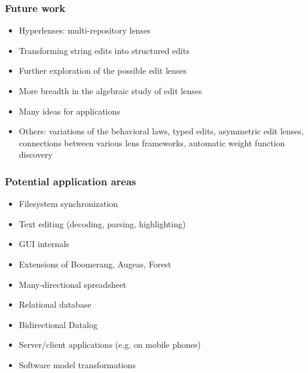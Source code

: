 \documentclass[table]{beamer}
\begin{document}
\begin{frame}[noframenumbering]
    \frametitle{Future work}
    \begin{itemize}
        \item Hyperlenses: multi-repository lenses
        \item Transforming string edits into structured edits
        \item Further exploration of the possible edit lenses
        \item More breadth in the algebraic study of edit lenses
        \item Many ideas for applications
        \item Others: variations of the behavioral laws, typed edits,
            asymmetric edit lenses, connections between various lens
            frameworks, automatic weight function discovery
    \end{itemize}
\end{frame}

\begin{frame}[noframenumbering]
    \frametitle{Potential application areas}
    \begin{itemize}
        \item Filesystem synchronization
        \item Text editing (decoding, parsing, highlighting)
        \item GUI internals
        \item Extensions of Boomerang, Augeas, Forest
        \item Many-directional spreadsheet
        \item Relational database
        \item Bidirectional Datalog
        \item Server/client applications (e.g. on mobile phones)
        \item Software model transformations
    \end{itemize}
\end{frame}
\end{document}
